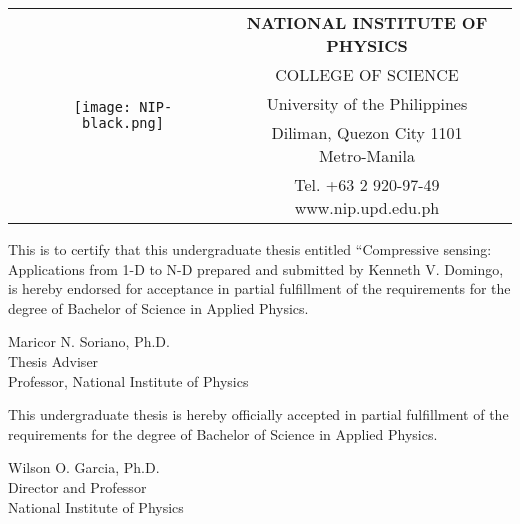 \begin{table}
	\begin{tabular}{ccc}
		\multirow{5}{*}{
			\begin{figure}
				\centering
				\texttt{[image: NIP-black.png]}
			\end{figure}
		} & \textbf{\uppercase{National Institute of Physics}} & \\
	& \uppercase{College of Science} & \\
	& University of the Philippines & \\
	& Diliman, Quezon City 1101 Metro-Manila & \\
	& Tel. +63 2 920-97-49 \quad www.nip.upd.edu.ph & \\
	\bottomrule
	\end{tabular}
\end{table}

\vspace{10pt}

\noindent This is to certify that this undergraduate thesis entitled ``Compressive sensing: Applications from 1-D to N-D prepared and submitted by Kenneth V. Domingo, is hereby endorsed for acceptance in partial fulfillment of the requirements for the degree of Bachelor of Science in Applied Physics.

\vspace{0.25in}

\begin{center}
	Maricor N. Soriano, Ph.D. \\
	Thesis Adviser \\
	Professor, National Institute of Physics
\end{center}

\vspace{60pt}

This undergraduate thesis is hereby officially accepted in partial fulfillment of the requirements for the degree of Bachelor of Science in Applied Physics.

\vspace{0.25in}

\begin{flushright}
	\parbox{0.4\textwidth}{
		\centering
		Wilson O. Garcia, Ph.D. \\
		Director and Professor \\
		National Institute of Physics
	}
\end{flushright}